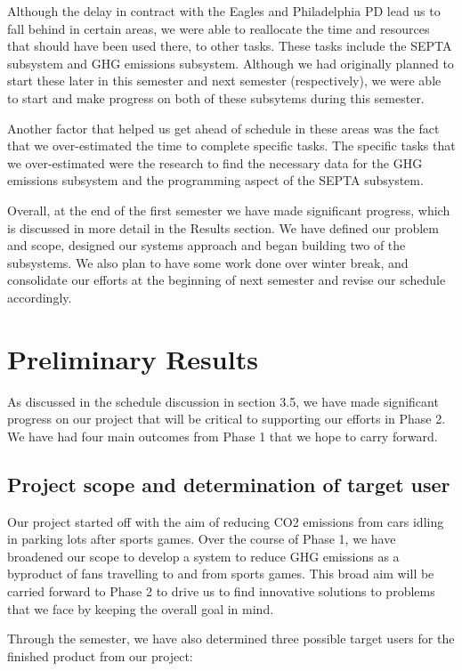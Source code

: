 \documentclass[12pt]{article}
\begin{document}
Although the delay in contract with the Eagles and Philadelphia PD
lead us to fall behind in certain areas, we were able to reallocate
the time and resources that should have been used there, to other
tasks. These tasks include the SEPTA subsystem and GHG emissions
subsystem. Although we had originally planned to start these later in
this semester and next semester (respectively), we were able to start
and make progress on both of these subsytems during this semester.

Another factor that helped us get ahead of schedule in these areas was
the fact that we over-estimated the time to complete specific
tasks. The specific tasks that we over-estimated were the research to
find the necessary data for the GHG emissions subsystem and the
programming aspect of the SEPTA subsystem.

Overall, at the end of the first semester we have made significant
progress, which is discussed in more detail in the Results section. We
have defined our problem and scope, designed our systems approach and
began building two of the subsystems. We also plan to have some work
done over winter break, and consolidate our efforts at the beginning
of next semester and revise our schedule accordingly.

\section{Preliminary Results}
As discussed in the schedule discussion in section 3.5, we have made
significant progress on our project that will be critical to
supporting our efforts in Phase 2. We have had four main outcomes from
Phase 1 that we hope to carry forward.

\subsection{Project scope and determination of target user}

Our project started off with the aim of reducing CO2 emissions from
cars idling in parking lots after sports games. Over the course of
Phase 1, we have broadened our scope to develop a system to reduce GHG
emissions as a byproduct of fans travelling to and from sports
games. This broad aim will be carried forward to Phase 2 to drive us
to find innovative solutions to problems that we face by keeping the
overall goal in mind.

Through the semester, we have also determined three possible target
users for the finished product from our project:
\end{document}
